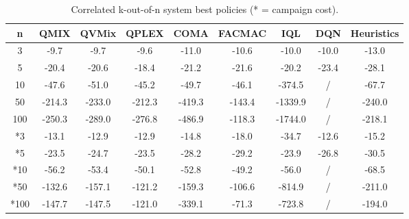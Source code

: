 \begin{table}
\centering
\caption{Correlated k-out-of-n system best policies (* = campaign cost).}
\label{tab:correlatedkoutofnresults}
\setlength\tabcolsep{4.5pt}
\begin{tabular}{c|ccccccc|c}
\toprule
n & QMIX & QVMix & QPLEX & COMA & FACMAC & IQL & DQN & Heuristics \\
\midrule
3 & -9.7 & -9.7 & -9.6 & -11.0 & -10.6 & -10.0 & -10.0 & -13.0 \\
5 & -20.4 & -20.6 & -18.4 & -21.2 & -21.6 & -20.2 & -23.4 & -28.1 \\
10 & -47.6 & -51.0 & -45.2 & -49.7 & -46.1 & -374.5 & / & -67.7 \\
50 & -214.3 & -233.0 & -212.3 & -419.3 & -143.4 & -1339.9 & / & -240.0 \\
100 & -250.3 & -289.0 & -276.8 & -486.9 & -118.3 & -1744.0 & / & -218.1 \\
\midrule
*3 & -13.1 & -12.9 & -12.9 & -14.8 & -18.0 & -34.7 & -12.6 & -15.2 \\
*5 & -23.5 & -24.7 & -23.5 & -28.2 & -29.2 & -23.9 & -26.8 & -30.5 \\
*10 & -56.2 & -53.4 & -50.1 & -52.8 & -49.2 & -56.0 & / & -68.5 \\
*50 & -132.6 & -157.1 & -121.2 & -159.3 & -106.6 & -814.9 & / & -211.0 \\
*100 & -147.7 & -147.5 & -121.0 & -339.1 & -71.3 & -723.8 & / & -194.0 \\
\bottomrule
\end{tabular}
\end{table}



